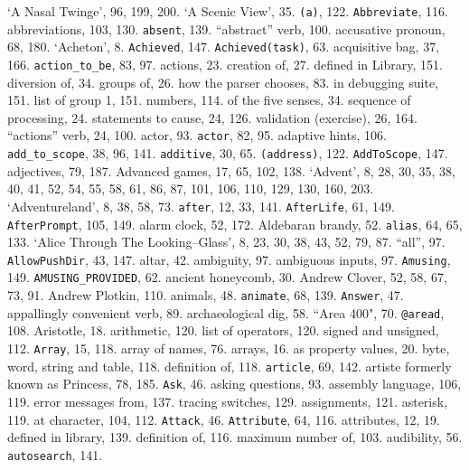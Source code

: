 {{{`A Nasal Twinge', 96, 199, 200.
`A Scenic View', 35.
{{\tt (a)}}, 122.
{{\tt Abbreviate}}, 116.
abbreviations, 103, 130.
{{\tt absent}}, 139.
``abstract'' verb, 100.
accusative pronoun, 68, 180.
`Acheton', 8.
{{\tt Achieved}}, 147.
{{\tt Achieved(task)}}, 63.
acquisitive bag, 37, 166.
{{\tt action\_to\_be}}, 83, 97.
actions, 23.
\quad  creation of, 27.
\quad  defined in Library, 151.
\quad  diversion of, 34.
\quad  groups of, 26.
\quad  how the parser chooses, 83.
\quad  in debugging suite, 151.
\quad  list of group 1, 151.
\quad  numbers, 114.
\quad  of the five senses, 34.
\quad  sequence of processing, 24.
\quad  statements to cause, 24, 126.
\quad  validation (exercise), 26, 164.
``actions'' verb, 24, 100.
actor, 93.
{{\tt actor}}, 82, 95.
adaptive hints, 106.
{{\tt add\_to\_scope}}, 38, 96, 141.
{{\tt additive}}, 30, 65.
{{\tt (address)}}, 122.
{{\tt AddToScope}}, 147.
adjectives, 79, 187.
Advanced games, 17, 65, 102, 138.
`Advent', 8, 28, 30, 35, 38, 40, 41, 52, 54, 55, 58, 61, 86, 87, 101, 106, 110, 129, 130, 160, 203.
`Adventureland', 8, 38, 58, 73.
{{\tt after}}, 12, 33, 141.
{{\tt AfterLife}}, 61, 149.
{{\tt AfterPrompt}}, 105, 149.
alarm clock, 52, 172.
Aldebaran brandy, 52.
{{\tt alias}}, 64, 65, 133.
`Alice Through The Looking\---Glass', 8, 23, 30, 38, 43, 52, 79, 87.
``all'', 97.
{{\tt AllowPushDir}}, 43, 147.
altar, 42.
ambiguity, 97.
ambiguous inputs, 97.
{{\tt Amusing}}, 149.
{{\tt AMUSING\_PROVIDED}}, 62.
ancient honeycomb, 30.
Andrew Clover, 52, 58, 67, 73, 91.
Andrew Plotkin, 110.
animals, 48.
{{\tt animate}}, 68, 139.
{{\tt Answer}}, 47.
appallingly convenient verb, 89.
archaeological dig, 58.
``Area 400", 70.
{{\tt @aread}}, 108.
Aristotle, 18.
arithmetic, 120.
\quad  list of operators, 120.
\quad  signed and unsigned, 112.
{{\tt Array}}, 15, 118.
array of {\fam \ttfam \tentt name}s, 76.
arrays, 16.
\quad  as property values, 20.
\quad  byte, word, string and table, 118.
\quad  definition of, 118.
{{\tt article}}, 69, 142.
artiste formerly known as Princess, 78, 185.
{{\tt Ask}}, 46.
asking questions, 93.
assembly language, 106, 119.
\quad  error messages from, 137.
\quad  tracing switches, 129.
assignments, 121.
asterisk, 119.
at character, 104, 112.
{{\tt Attack}}, 46.
{{\tt Attribute}}, 64, 116.
attributes, 12, 19.
\quad  defined in library, 139.
\quad  definition of, 116.
\quad  maximum number of, 103.
audibility, 56.
{{\tt autosearch}}, 141.

}}}
